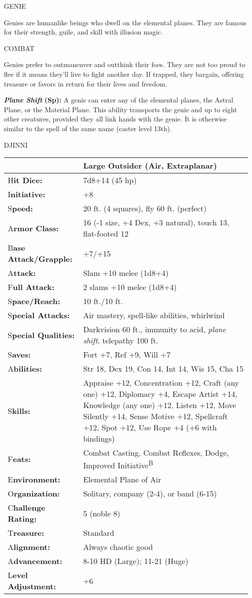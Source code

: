 \documentclass{article}
\begin{document}
\vspace{12pt}
{\LARGE{}GENIE}

Genies are humanlike beings who dwell on the elemental planes. They are famous 
for their strength, guile, and skill with illusion magic.

COMBAT

Genies prefer to outmaneuver and outthink their foes. They are not too proud to 
flee if it means they'll live to fight another day. If trapped, they bargain, offering 
treasure or favors in return for their lives and freedom.

\textit{\textbf{Plane Shift }}\textbf{(Sp): }A genie can enter any of the elemental 
planes, the Astral Plane, or the Material Plane. This ability transports the genie 
and up to eight other creatures, provided they all link hands with the genie. It 
is otherwise similar to the spell of the same name (caster level 13th).

DJINNI

\begin{tabular}{|>{\raggedright}p{82pt}|>{\raggedright}p{243pt}|}
\hline
  & Large Outsider (Air, Extraplanar)\tabularnewline
\hline
H\textbf{it Dice:} & 7d8+14 (45 hp)\tabularnewline
\hline
I\textbf{nitiative:} & +8\tabularnewline
\hline
S\textbf{peed:} & 20 ft. (4 squares), fly 60 ft. (perfect)\tabularnewline
\hline
A\textbf{rmor Class:} & 16 (-1 size, +4 Dex, +3 natural), touch 13, flat-footed 
12\tabularnewline
\hline
B\textbf{ase Attack/Grapple:} & +7/+15\tabularnewline
\hline
A\textbf{ttack:} & Slam +10 melee (1d8+4)\tabularnewline
\hline
F\textbf{ull Attack:} & 2 slams +10 melee (1d8+4)\tabularnewline
\hline
S\textbf{pace/Reach:} & 10 ft./10 ft.\tabularnewline
\hline
S\textbf{pecial Attacks:} & Air mastery, spell-like abilities, whirlwind\tabularnewline
\hline
S\textbf{pecial Qualities:} & Darkvision 60 ft., immunity to acid, \textit{plane 
shift}, telepathy 100 ft.\tabularnewline
\hline
S\textbf{aves:} & Fort +7, Ref +9, Will +7\tabularnewline
\hline
A\textbf{bilities:} & Str 18, Dex 19, Con 14, Int 14, Wis 15, Cha 15\tabularnewline
\hline
S\textbf{kills:} & Appraise +12, Concentration +12, Craft (any one) +12, Diplomacy 
+4, Escape Artist +14, Knowledge (any one) +12, Listen +12, Move Silently +14, 
Sense Motive +12, Spellcraft +12, Spot +12, Use Rope +4 (+6 with bindings)\tabularnewline
\hline
F\textbf{eats:} & Combat Casting, Combat Reflexes, Dodge, Improved Initiative\textsuperscript{B}\tabularnewline
\hline
E\textbf{nvironment:} & Elemental Plane of Air\tabularnewline
\hline
O\textbf{rganization:} & Solitary, company (2-4), or band (6-15)\tabularnewline
\hline
C\textbf{hallenge Rating:} & 5 (noble 8)\tabularnewline
\hline
T\textbf{reasure:} & Standard\tabularnewline
\hline
A\textbf{lignment:} & Always chaotic good\tabularnewline
\hline
A\textbf{dvancement:} & 8-10 HD (Large); 11-21 (Huge)\tabularnewline
\hline
L\textbf{evel Adjustment:} & +6\tabularnewline
\hline
\end{tabular}
\end{document}
